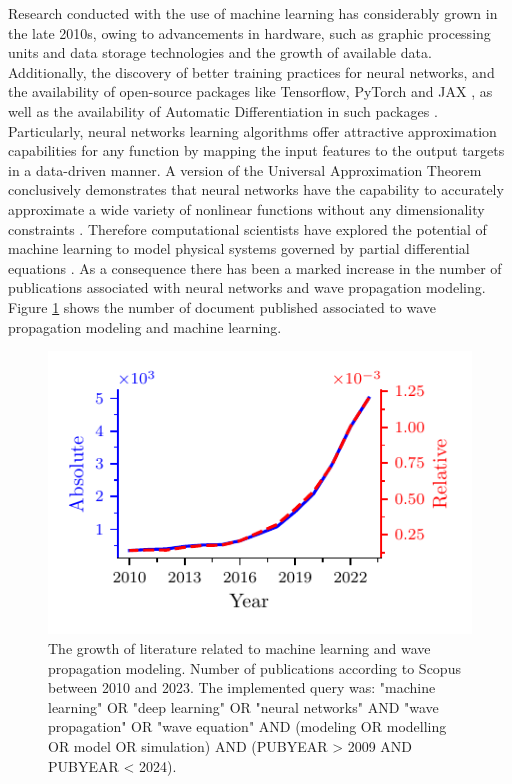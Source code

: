 \documentclass[11pt,twoside]{article}
\begin{document}
Research conducted with the use of machine learning has considerably grown in the late 2010s, owing to advancements in hardware, such 
as graphic processing units and data storage technologies and the growth of available data. Additionally, the discovery of better training 
practices for neural networks, and the availability of open-source packages like Tensorflow, PyTorch and 
JAX \citep{abadi_tensorflow_2016,paszke_pytorch_2019,jax2018github}, as well as the availability of Automatic Differentiation in such 
packages \citep{paszke_automatic_2017,baydin_automatic_2017}. Particularly, neural networks learning algorithms offer attractive approximation 
capabilities for any function by mapping the input features to the output targets in a data-driven manner. A version of the Universal 
Approximation Theorem conclusively demonstrates that neural networks have the capability to accurately approximate a wide variety of 
nonlinear functions without any dimensionality constraints \citep{barron_universal_1993}. Therefore computational scientists have
explored the potential of machine learning to model physical systems governed by partial differential equations 
\citep{cuomo_scientific_2022,karniadakis_physics-informed_2021}. As a consequence there has been a marked increase 
in the number of publications associated with neural networks and wave propagation modeling. Figure 
\ref{fig:publications_absolute_relative} shows the number of document published associated to wave propagation modeling 
and machine learning. 

\begin{figure}[H]
\centering
    \includegraphics[scale=1]{figs/publications_absolute_relative.pdf}
    \caption{The growth of literature related to machine learning and wave propagation modeling. Number of publications according 
    to Scopus between 2010 and 2023. The implemented query was: "machine learning" OR "deep learning" OR "neural networks" AND 
    "wave propagation" OR "wave equation" AND (modeling OR modelling OR model OR simulation) AND (PUBYEAR > 2009 AND PUBYEAR < 2024).}
    \label{fig:publications_absolute_relative}
\end{figure}
\end{document}
